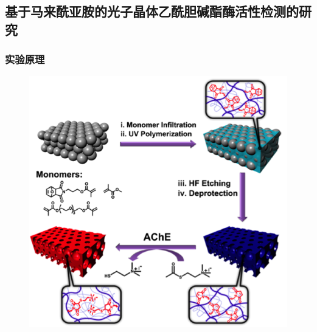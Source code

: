 \documentclass{beamer}
\begin{document}


\subsection{基于马来酰亚胺的光子晶体乙酰胆碱酯酶活性检测的研究}
\begin{frame}
  \frametitle{实验原理}
  \begin{figure}[t]
    \centering
    \includegraphics[height=0.60\linewidth]{figures/ACHe.png}
  \end{figure}
\end{frame}
\end{document}
